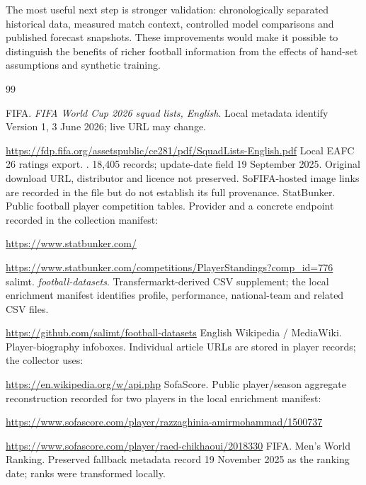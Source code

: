 \documentclass[11pt,a4paper]{article}
\begin{document}
The most useful next step is stronger validation: chronologically separated
historical data, measured match context, controlled model comparisons and
published forecast snapshots. These improvements would make it possible to
distinguish the benefits of richer football information from the effects of
hand-set assumptions and synthetic training.


\clearpage
{}
\renewcommand{\refname}{References and Data Sources}
\begin{thebibliography}{99}
\small\raggedright
\setlength{\itemsep}{3pt}
\setlength{\parskip}{1pt}
\setlength{\parsep}{0pt}
 FIFA. \emph{FIFA World Cup 2026 squad lists, English}.
Local metadata identify Version 1, 3 June 2026; live URL may change.
\par\url{https://fdp.fifa.org/assetspublic/ce281/pdf/SquadLists-English.pdf}
 Local EAFC 26 ratings export. .
18,405 records; update-date field 19 September 2025. Original download URL,
distributor and licence not preserved. SoFIFA-hosted image links are recorded
in the file but do not establish its full provenance.
 StatBunker. Public football player competition tables.
Provider and a concrete endpoint recorded in the collection manifest:
\par\url{https://www.statbunker.com/}
\par\url{https://www.statbunker.com/competitions/PlayerStandings?comp_id=776}
 salimt. \emph{football-datasets}. Transfermarkt-derived
CSV supplement; the local enrichment manifest identifies profile, performance,
national-team and related CSV files.
\par\url{https://github.com/salimt/football-datasets}
 English Wikipedia / MediaWiki. Player-biography infoboxes.
Individual article URLs are stored in player records; the collector uses:
\par\url{https://en.wikipedia.org/w/api.php}
 SofaScore. Public player/season aggregate reconstruction
recorded for two players in the local enrichment manifest:
\par\url{https://www.sofascore.com/player/razzaghinia-amirmohammad/1500737}
\par\url{https://www.sofascore.com/player/raed-chikhaoui/2018330}
 FIFA. Men's World Ranking. Preserved fallback metadata
record 19 November 2025 as the ranking date; ranks were transformed locally.

\end{thebibliography}
\end{document}

